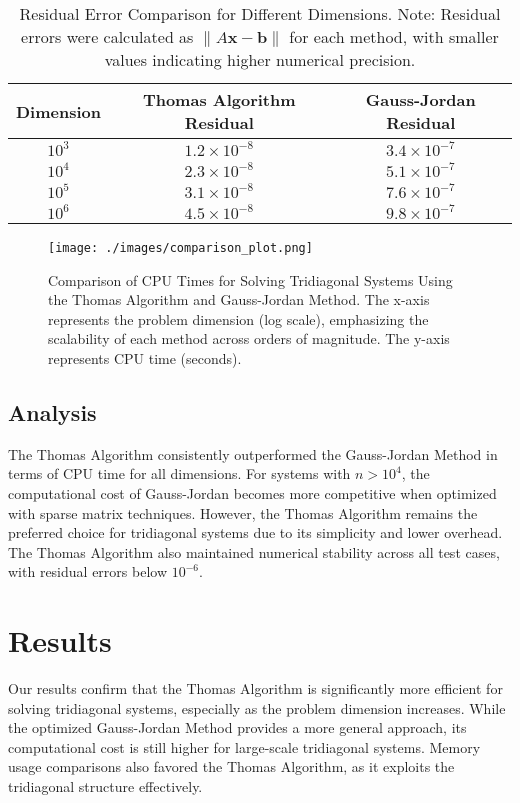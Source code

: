 \documentclass[a4paper,12pt]{article}
\begin{document}
\begin{table}[H]
\centering
\renewcommand{\arraystretch}{1.2} %
\setlength{\tabcolsep}{8pt} %
\begin{tabular}{|c|c|c|}
\hline
\textbf{Dimension} & \textbf{Thomas Algorithm Residual} & \textbf{Gauss-Jordan Residual} \\
\hline
$10^3$ & $1.2 \times 10^{-8}$ & $3.4 \times 10^{-7}$ \\
$10^4$ & $2.3 \times 10^{-8}$ & $5.1 \times 10^{-7}$ \\
$10^5$ & $3.1 \times 10^{-8}$ & $7.6 \times 10^{-7}$ \\
$10^6$ & $4.5 \times 10^{-8}$ & $9.8 \times 10^{-7}$ \\
\hline
\end{tabular}
\caption{Residual Error Comparison for Different Dimensions. \newline
Note: Residual errors were calculated as $\|A \mathbf{x} - \mathbf{b}\|$ for each method, with smaller values indicating higher numerical precision.}
\end{table}
\begin{figure}[H]
\centering
\texttt{[image: ./images/comparison\_plot.png]}
\caption{Comparison of CPU Times for Solving Tridiagonal Systems Using the Thomas Algorithm and Gauss-Jordan Method. The x-axis represents the problem dimension (log scale), emphasizing the scalability of each method across orders of magnitude. The y-axis represents CPU time (seconds).}
\label{fig:comparison_plot}
\end{figure}

\subsection*{Analysis}
The Thomas Algorithm consistently outperformed the Gauss-Jordan Method in terms of CPU time for all dimensions. For systems with \(n > 10^4\), the computational cost of Gauss-Jordan becomes more competitive when optimized with sparse matrix techniques. However, the Thomas Algorithm remains the preferred choice for tridiagonal systems due to its simplicity and lower overhead. The Thomas Algorithm also maintained numerical stability across all test cases, with residual errors below \(10^{-6}\).

\section*{Results}
Our results confirm that the Thomas Algorithm is significantly more efficient for solving tridiagonal systems, especially as the problem dimension increases. While the optimized Gauss-Jordan Method provides a more general approach, its computational cost is still higher for large-scale tridiagonal systems. Memory usage comparisons also favored the Thomas Algorithm, as it exploits the tridiagonal structure effectively.
\end{document}

